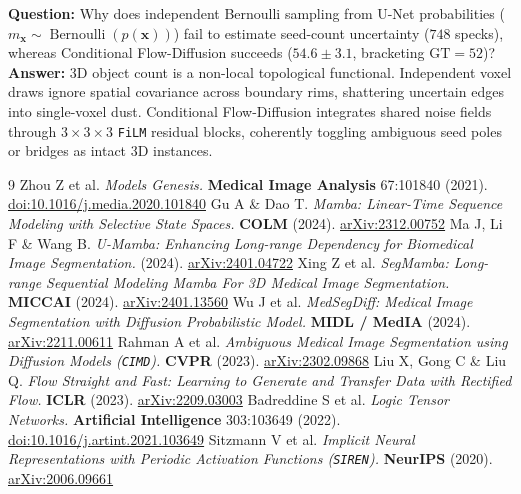 \documentclass[10.5pt,a4paper]{article}
\begin{document}
\begin{qabox}
\textbf{Question:} Why does independent Bernoulli sampling from U-Net probabilities ($m_{\mathbf{x}} \sim \operatorname{Bernoulli}(p(\mathbf{x}))$) fail to estimate seed-count uncertainty ($748$ specks), whereas Conditional Flow-Diffusion succeeds ($54.6 \pm 3.1$, bracketing $\text{GT}=52$)?\\[2pt]
\textbf{Answer:} 3D object count is a non-local topological functional. Independent voxel draws ignore spatial covariance across boundary rims, shattering uncertain edges into single-voxel dust. Conditional Flow-Diffusion integrates shared noise fields through $3\times 3\times 3$ \texttt{FiLM} residual blocks, coherently toggling ambiguous seed poles or bridges as intact 3D instances.
\end{qabox}

\begin{thebibliography}{9}
\scriptsize
\setlength{\itemsep}{1.5pt}
     Zhou Z et al. \emph{Models Genesis.} \textbf{Medical Image Analysis} 67:101840 (2021). \href{https://doi.org/10.1016/j.media.2020.101840}{doi:10.1016/j.media.2020.101840}
     Gu A \& Dao T. \emph{Mamba: Linear-Time Sequence Modeling with Selective State Spaces.} \textbf{COLM} (2024). \href{https://arxiv.org/abs/2312.00752}{arXiv:2312.00752}
     Ma J, Li F \& Wang B. \emph{U-Mamba: Enhancing Long-range Dependency for Biomedical Image Segmentation.} (2024). \href{https://arxiv.org/abs/2401.04722}{arXiv:2401.04722}
     Xing Z et al. \emph{SegMamba: Long-range Sequential Modeling Mamba For 3D Medical Image Segmentation.} \textbf{MICCAI} (2024). \href{https://arxiv.org/abs/2401.13560}{arXiv:2401.13560}
     Wu J et al. \emph{MedSegDiff: Medical Image Segmentation with Diffusion Probabilistic Model.} \textbf{MIDL / MedIA} (2024). \href{https://arxiv.org/abs/2211.00611}{arXiv:2211.00611}
     Rahman A et al. \emph{Ambiguous Medical Image Segmentation using Diffusion Models (\texttt{CIMD}).} \textbf{CVPR} (2023). \href{https://arxiv.org/abs/2302.09868}{arXiv:2302.09868}
     Liu X, Gong C \& Liu Q. \emph{Flow Straight and Fast: Learning to Generate and Transfer Data with Rectified Flow.} \textbf{ICLR} (2023). \href{https://arxiv.org/abs/2209.03003}{arXiv:2209.03003}
     Badreddine S et al. \emph{Logic Tensor Networks.} \textbf{Artificial Intelligence} 303:103649 (2022). \href{https://doi.org/10.1016/j.artint.2021.103649}{doi:10.1016/j.artint.2021.103649}
     Sitzmann V et al. \emph{Implicit Neural Representations with Periodic Activation Functions (\texttt{SIREN}).} \textbf{NeurIPS} (2020). \href{https://arxiv.org/abs/2006.09661}{arXiv:2006.09661}
\end{thebibliography}
\end{document}
